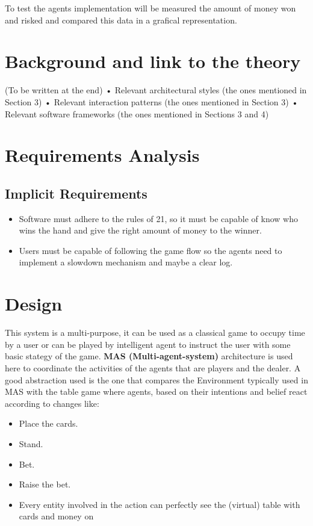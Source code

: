 To test the agents implementation will be measured the amount of money won and risked and compared this data in a grafical representation.

\chapter{Background and link to the theory}

(To be written at the end)
• Relevant architectural styles (the ones mentioned in Section 3)
• Relevant interaction patterns (the ones mentioned in Section 3)
• Relevant software frameworks (the ones mentioned in Sections 3 and 4)


\chapter{Requirements Analysis}

\section{Implicit Requirements}
\begin{itemize}
   \item Software must adhere to the rules of 21, so it must be capable of know who wins the hand and give the right amount of money to the winner.
   \item Users must be capable of following the game flow so the agents need to implement a slowdown mechanism and maybe a clear log.
\end{itemize}

\chapter{Design}

This system is a multi-purpose, it can be used as a classical game to occupy time by a user or can be played by intelligent agent to instruct the user with some basic stategy of the game. \textbf{MAS (Multi-agent-system)} architecture is used here to coordinate the activities of the agents that are players and the dealer. A good abstraction used is the one that compares the Environment typically used in MAS with the table game where agents, based on their intentions and belief react according to changes like: 
\begin{itemize}
    \item Place the cards.
    \item Stand.
    \item Bet.
    \item Raise the bet.
    \item Every entity involved in the action can perfectly see the (virtual) table with cards and money on
 \end{itemize}


